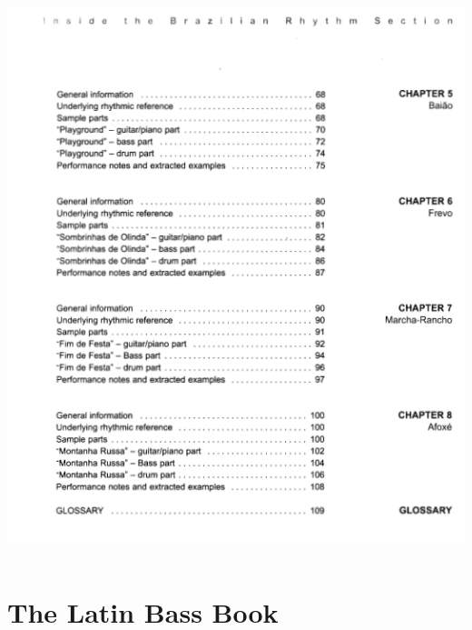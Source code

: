 \documentclass[a4paper]{book}
\begin{document}
\begin{center}
\includegraphics[width=13.942cm,height=16.268cm]{lebluessupportsmethodes-img172.png}
\end{center}



\clearpage\section{The Latin Bass Book}
\end{document}
